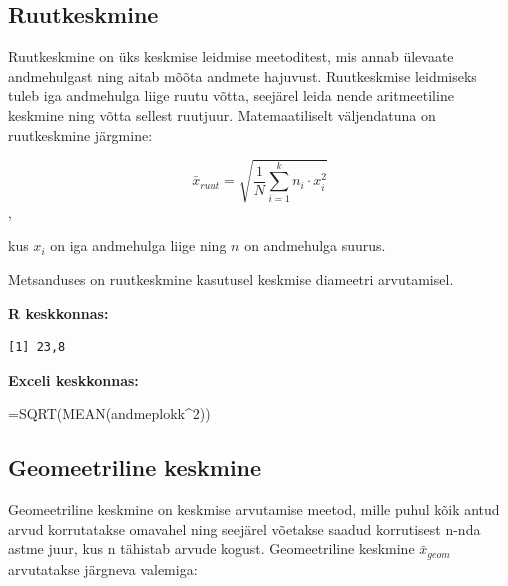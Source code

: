 \documentclass[
]{book}
\newenvironment{Shaded}{\begin{snugshade}}{\end{snugshade}}
\newcommand{\CommentTok}[1]{\textcolor[rgb]{0.56,0.35,0.01}{\textit{#1}}}
\newcommand{\DecValTok}[1]{\textcolor[rgb]{0.00,0.00,0.81}{#1}}
\newcommand{\FunctionTok}[1]{\textcolor[rgb]{0.13,0.29,0.53}{\textbf{#1}}}
\newcommand{\NormalTok}[1]{#1}
\newcommand{\SpecialCharTok}[1]{\textcolor[rgb]{0.81,0.36,0.00}{\textbf{#1}}}
\renewenvironment{Shaded} {\begin{snugshade}\footnotesize} {\end{snugshade}}
\begin{document}
\subsection{Ruutkeskmine}\label{ruutkeskmine}

Ruutkeskmine on üks keskmise leidmise meetoditest, mis annab ülevaate andmehulgast ning aitab mõõta andmete hajuvust. Ruutkeskmise leidmiseks tuleb iga andmehulga liige ruutu võtta, seejärel leida nende aritmeetiline keskmine ning võtta sellest ruutjuur. Matemaatiliselt väljendatuna on ruutkeskmine järgmine:

\[ \bar x_{ruut}=\sqrt{\frac{1}{N}\sum_{i=1}^{k}n_i \cdot x_i^2} \],

kus \(x_{i}\) on iga andmehulga liige ning \(n\) on andmehulga suurus.

Metsanduses on ruutkeskmine kasutusel keskmise diameetri arvutamisel.

\textbf{R keskkonnas:}

\begin{Shaded}
\end{Shaded}

\begin{verbatim}
[1] 23,8
\end{verbatim}

\textbf{Exceli keskkonnas:}

\begin{Shaded}
\begin{Highlighting}[]
\NormalTok{=SQRT(MEAN(andmeplokk\^{}2))}
\end{Highlighting}
\end{Shaded}

\subsection{Geomeetriline keskmine}\label{geomeetriline-keskmine}

Geomeetriline keskmine on keskmise arvutamise meetod, mille puhul kõik antud arvud korrutatakse omavahel ning seejärel võetakse saadud korrutisest n-nda astme juur, kus n tähistab arvude kogust. Geomeetriline keskmine \(\bar x_{geom}\) arvutatakse järgneva valemiga:
\end{document}
